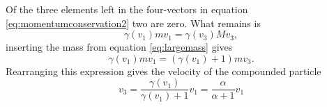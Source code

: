 \documentclass[11pt]{amsart}
\begin{document}
Of the three elements left in the four-vectors in equation \ref{eq:momentumconservation2} two are zero. What remains is
\begin{equation}
\gamma(v_1)mv_1 = \gamma(v_3)Mv_3,
\end{equation}
inserting the mass from equation \ref{eq:largemass} gives
\begin{equation}
\gamma(v_1)mv_1 = (\gamma(v_1) + 1)mv_3.
\end{equation}
Rearranging this expression gives the velocity of the compounded particle
\begin{equation}
v_3 = \frac{\gamma(v_1)}{\gamma(v_1)+1}v_1 = \frac{\alpha}{\alpha+1}v_1
\end{equation}
\end{document}
